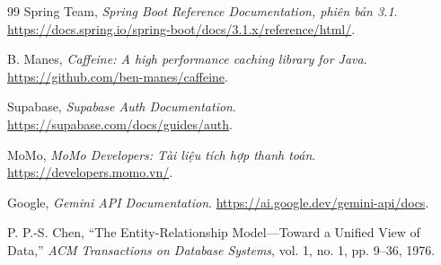 \begin{thebibliography}{99}
Spring Team, \textit{Spring Boot Reference Documentation, phiên bản 3.1}. \url{https://docs.spring.io/spring-boot/docs/3.1.x/reference/html/}.

B. Manes, \textit{Caffeine: A high performance caching library for Java}. \url{https://github.com/ben-manes/caffeine}.

Supabase, \textit{Supabase Auth Documentation}. \url{https://supabase.com/docs/guides/auth}.

MoMo, \textit{MoMo Developers: Tài liệu tích hợp thanh toán}. \url{https://developers.momo.vn/}.

Google, \textit{Gemini API Documentation}. \url{https://ai.google.dev/gemini-api/docs}.

P. P.-S. Chen, ``The Entity-Relationship Model---Toward a Unified View of Data,'' \textit{ACM Transactions on Database Systems}, vol. 1, no. 1, pp. 9--36, 1976.

\end{thebibliography}
